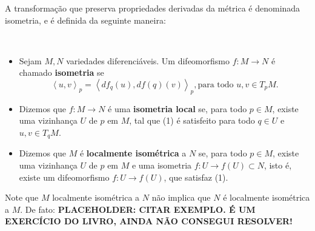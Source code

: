 A transformação que preserva propriedades derivadas da métrica é denominada isometria, e é definida da seguinte maneira:
\begin{definition}
    \label{loc:definicao_isometria}
    $ $
    \begin{itemize}
        \item Sejam $M,N$ variedades diferenciáveis. Um difeomorfismo $f:M\to N$ é chamado \textbf{isometria} se
              \begin{equation*}
                  \left< u, v \right>_{p}=\left< df_{q}(u), df(q)(v) \right>_{p}, \text{para todo } u,v \in T_{p}M. \tag{1}
              \end{equation*}
        \item Dizemos que $f:M\to N$ é uma \textbf{isometria local} se, para todo $p \in M$, existe uma vizinhança $U$ de $p$ em $M$, tal que (1) é satisfeito para todo $q \in U$ e $u,v \in T_{q}M$.
        \item Dizemos que $M$ é \textbf{localmente isométrica} a $N$ se, para todo $p \in M$, existe uma vizinhança $U$ de $p$ em $M$ e uma isometria $f:U\to f(U) \subset N$, isto é, existe um difeomorfismo $f:U\to f(U)$, que satisfaz (1).
    \end{itemize}
\end{definition}
Note que $M$ localmente isométrica a $N$ não implica que $N$ é localmente isométrica a $M$. De fato: \textbf{PLACEHOLDER: CITAR EXEMPLO. É UM EXERCÍCIO DO LIVRO, AINDA NÃO CONSEGUI RESOLVER!}
